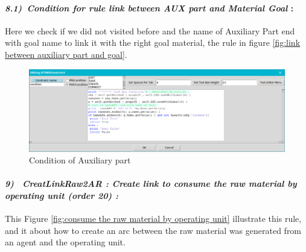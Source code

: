 \paragraph{\emph{8.1)~Condition for rule link between AUX part and Material Goal } : }
Here we check if we did not visited before  and the name of Auxiliary Part end with goal name to link it with the right goal material, the rule in figure \ref{fig:link between auxiliary part and goal}.
 
\vspace{1cm}
 
\begin{figure}[th]
	\centering
 	\includegraphics[scale=0.37]{ch3/img/condaux}
	\caption{\label{fig:Condition of Auxiliary part}Condition of Auxiliary part  }
\end{figure} 


\paragraph{\emph{9)~ CreatLinkRaw2AR : Create link to consume the raw material by operating unit  (order 20) :} }
 
 
This Figure \ref{fig:consume the raw material by operating unit}  illustrate  this rule, and it about how to create an arc between 
the raw material was generated from an agent and the operating unit.


